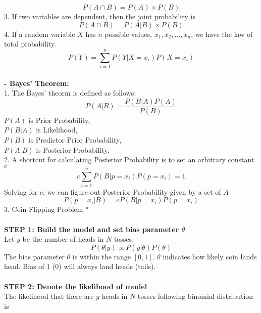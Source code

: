\documentclass{article}
\begin{document}
\begin{enumerate}[S1 - ]
    \begin{equation*}
    P(A \cap B) = P(A) \times P(B)
    \end{equation*}
    3. If two variables are dependent, then the joint probability is
    \begin{equation*}
    P(A \cap B) = P(A|B) \times P(B)
    \end{equation*}
    4. If a random variable $X$ has $n$ possible values, $x_1, x_2,...,x_n$, we have the law of total probability.
    \begin{equation*}
    P(Y) = \sum_{i=1}^{n} P(Y|X=x_i) P(X=x_i)
    \end{equation*}
    \\
    \textbf{- Bayes' Theorem:}\\
    1. The Bayes' theorm is defined as follows:
    \begin{equation*}
    P(A|B) = \frac{P(B|A) P(A)}{P(B)}
    \end{equation*}
    $P(A)$ is Prior Probability,\\
    $P(B|A)$ is Likelihood,\\
    $P(B)$ is Predictor Prior Probability,\\ $P(A|B)$ is Posterior Probability.\\
    2. A shortcut for calculating Posterior Probability is to set an arbitrary constant $c$
    \begin{equation*}
    c \sum_{i=1}^{n} P(B|p=x_i)P(p=x_i) =1
    \end{equation*}
    Solving for $c$, we can figure out Posterior Probability given by a set of $A$
    \begin{equation*}
    P(p=x_i|B) = c P(B|p=x_i)P(p=x_i)
    \end{equation*}
    3. Coin-Flipping Problem *\\
    \\
    \textbf{STEP 1: Build the model and set bias parameter $\theta$}\\
    Let $y$ be the number of heads in $N$ tosses.
    \begin{equation*}
    P(\theta|y) \propto P(y|\theta)P(\theta)
    \end{equation*}
    The bias parameter $\theta$ is within the range $[0,1]$. $\theta$ indicates how likely coin lands head. Bias of 1 (0) will always land heads (tails).\\
    \\
    \textbf{STEP 2: Denote the likelihood of model}\\
    The likelihood that there are $y$ heads in $N$ tosses following binomial distribution is

\end{enumerate}
\end{document}
